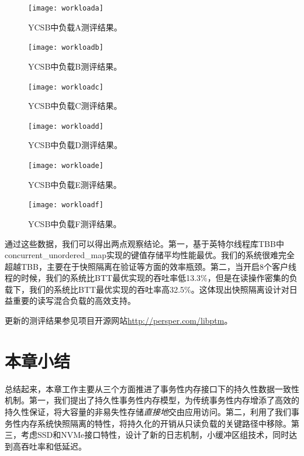 \begin{figure}[!ht]
  \centering
  \texttt{[image: workloada]}
  \caption{YCSB中负载A测评结果。}
  \label{fig:workload-a}
\end{figure}

\begin{figure}[!ht]
  \centering
  \texttt{[image: workloadb]}
  \caption{YCSB中负载B测评结果。}
  \label{fig:workload-b}
\end{figure}

\begin{figure}[!ht]
  \centering
  \texttt{[image: workloadc]}
  \caption{YCSB中负载C测评结果。}
  \label{fig:workload-c}
\end{figure}

\begin{figure}[!ht]
  \centering
  \texttt{[image: workloadd]}
  \caption{YCSB中负载D测评结果。}
  \label{fig:workload-d}
\end{figure}

\begin{figure}[!ht]
  \centering
  \texttt{[image: workloade]}
  \caption{YCSB中负载E测评结果。}
  \label{fig:workload-e}
\end{figure}

\begin{figure}[!ht]
  \centering
  \texttt{[image: workloadf]}
  \caption{YCSB中负载F测评结果。}
  \label{fig:workload-f}
\end{figure}

通过这些数据，我们可以得出两点观察结论。第一，基于英特尔线程库TBB中concurrent\_unordered\_map实现的键值存储平均性能最优。我们的系统很难完全超越TBB，主要在于快照隔离在验证等方面的效率瓶颈。第二，当开启8个客户线程的时候，我们的系统比BTT最优实现的吞吐率低13.3\%，但是在读操作密集的负载下，我们的系统比BTT最优实现的吞吐率高32.5\%。这体现出快照隔离设计对日益重要的读写混合负载的高效支持。

更新的测评结果参见项目开源网站\url{http://persper.com/libptm}。

\section{本章小结}

总结起来，本章工作主要从三个方面推进了事务性内存接口下的持久性数据一致性机制。第一，我们提出了持久性事务性内存模型，为传统事务性内存增添了高效的持久性保证，将大容量的非易失性存储\emph{直接地}交由应用访问。第二，利用了我们事务性内存系统快照隔离的特性，将持久化的开销从只读负载的关键路径中移除。第三，考虑SSD和NVMe接口特性，设计了新的日志机制，小缓冲区组技术，同时达到高吞吐率和低延迟。


